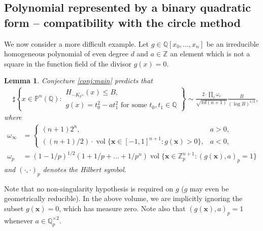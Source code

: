 \documentclass[a4paper,12pt,reqno]{amsart}
\numberwithin{equation}{section} \numberwithin{figure}{section}
\DeclareMathOperator{\vol}{vol} \DeclareMathOperator{\spn}{span}
\newcommand{\x}{\mathbf{x}}
\renewcommand\P{\mathbb{P}}
\newcommand\Z{\mathbb{Z}}
\newcommand\Q{\mathbb{Q}}
\renewcommand{\leq}{\leqslant}
\renewcommand{\#}{\sharp}
\newtheorem{lemma}{Lemma}
\theoremstyle{definition}
\newtheorem{remark}[lemma]{Remark}
\numberwithin{lemma}{section}
\begin{document}

\subsection{Polynomial represented by a binary quadratic form -- compatibility with the circle method}
We now consider a more difficult example. Let $g \in \Q[x_0,\dots,x_n]$ be an irreducible homogeneous
polynomial of even degree $d$ and $a \in \Z$ an element which is not a square in the function field
of the divisor $g(x) = 0$.

\begin{lemma} \label{lem:circle_method}
	Conjecture \ref{conj:main} predicts that
	\begin{align*}
		&\#\left\{ x \in \P^n(\Q) : 
		\begin{array}{l}
		H_{-K_{\P^n}}(x) \leq B,  \\
		g(x) = t_0^2 - at_1^2 \text{ for some } t_0,t_1 \in \Q 
		\end{array}
		\right\} 
		\sim \frac{2 \cdot  \prod_v \omega_v }{\sqrt{\pi d(n+1)}} \frac{B}{(\log B)^{1/2}},
	\end{align*}
	where
	\begin{align*}
		\omega_\infty &= 
		\begin{cases}
			(n + 1)2^n	, & a > 0, \\
			((n+1)/2) \cdot \vol\{ \x \in [-1,1]^{n+1} : g(\x) > 0 \}, & a < 0,
		\end{cases} \\
		\omega_p &= 
			(1-1/p)^{1/2}(1+1/p + \dots + 1/p^n)
			\vol \{ \x \in \Z_p^{n+1} : (g(\x),a)_p = 1\}
	\end{align*}
	and $(\cdot,\cdot)_p$ denotes the Hilbert symbol.
\end{lemma}
Note that no non-singularity hypothesis is required on $g$ ($g$ may even be geometrically reducible). In the above volume, we are implicitly ignoring the subset $g(\x) = 0$, which has measure zero.  Note also that $(g(\x),a)_p = 1$ whenever $a \in \Q_p^{\times 2}$.
\end{document}
